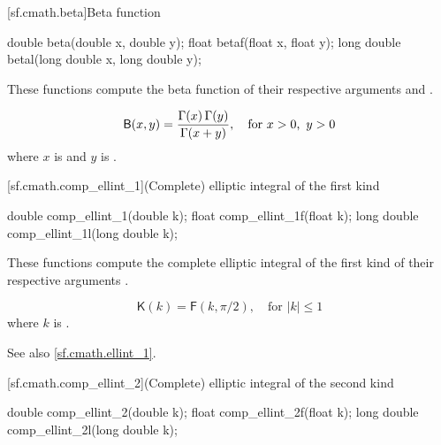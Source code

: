 [sf.cmath.beta]{Beta function}%
%
%
%
%
%
\begin{itemdecl}
double       beta(double x, double y);
float        betaf(float x, float y);
long double  betal(long double x, long double y);
\end{itemdecl}

\begin{itemdescr}

\pnum\effects
These functions compute
the beta function
of their respective arguments
 and .

\pnum\returns
\[%
  \mathsf{B}(x, y) =
  \frac{ \Gamma(x) \, \Gamma(y) }
       { \Gamma(x+y) },
       \quad \mbox{for $x > 0$,\, $y > 0$}
\]
where
$x$ is  and
$y$ is .
\end{itemdescr}

[sf.cmath.comp_ellint_1]{(Complete) elliptic integral of the first kind}%
%
%
%
%
%
\begin{itemdecl}
double       comp_ellint_1(double k);
float        comp_ellint_1f(float k);
long double  comp_ellint_1l(long double k);
\end{itemdecl}

\begin{itemdescr}
\pnum\effects
These functions compute
the complete elliptic integral of the first kind
of their respective arguments
.

\pnum\returns
\[%
  \mathsf{K}(k) =
  \mathsf{F}(k, \pi / 2),
		      \quad \mbox{for $|k| \le 1$}
\]
where
$k$ is .

\pnum See also \ref{sf.cmath.ellint_1}.
\end{itemdescr}

[sf.cmath.comp_ellint_2]{(Complete) elliptic integral of the second kind}%
%
%
%
%
%
\begin{itemdecl}
double       comp_ellint_2(double k);
float        comp_ellint_2f(float k);
long double  comp_ellint_2l(long double k);
\end{itemdecl}

